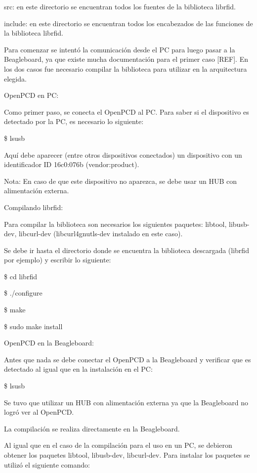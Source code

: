 \bigskip
src: en este directorio se encuentran todos los fuentes de la biblioteca librfid.

\bigskip
include: en este directorio se encuentran todos los encabezados de las funciones de la biblioteca librfid.


\bigskip
{}

\bigskip
Para comenzar se intentó la comunicación desde el PC para luego pasar a la Beagleboard, ya que existe mucha documentación para el primer caso [REF]. En los dos casos fue necesario compilar la biblioteca para utilizar en la arquitectura elegida.

\bigskip
OpenPCD en PC:

\bigskip
Como primer paso, se conecta el OpenPCD al PC. Para saber si el dispositivo es detectado por la PC, es necesario lo siguiente:

\bigskip
\centerline{\$ lsusb}

\bigskip
Aquí debe aparecer (entre otros dispositivos conectados) un dispositivo con un identificador ID 16c0:076b (vendor:product). 

\bigskip
Nota: En caso de que este dispositivo no aparezca, se debe usar un HUB con alimentación externa.

\bigskip
Compilando librfid:

\bigskip
Para compilar la biblioteca son necesarios los siguientes paquetes: libtool, libusb-dev, libcurl-dev (libcurl4gnutls-dev instalado en este caso).

\bigskip
Se debe ir hasta el directorio donde se encuentra la biblioteca descargada (librfid por ejemplo) y escribir lo siguiente:

\bigskip
\centerline{\$ cd librfid}

\centerline{\$ ./configure}

\centerline{\$ make}

\centerline{\$ sudo make install}


\bigskip
OpenPCD en la Beagleboard:

\bigskip
Antes que nada se debe conectar el OpenPCD a la Beagleboard y verificar que es detectado al igual que en la instalación en el PC:

\bigskip
\centerline{\$ lsusb}

\bigskip
Se tuvo que utilizar un HUB con alimentación externa ya que la Beagleboard no logró ver al OpenPCD.

\bigskip
La compilación se realiza directamente en la Beagleboard.

\bigskip
Al igual que en el caso de la compilación para el uso en un PC, se debieron obtener los paquetes libtool, libusb-dev, libcurl-dev. Para instalar los paquetes se utilizó el siguiente comando:

